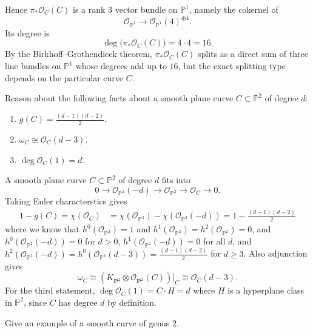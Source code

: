 \documentclass[12pt]{article}
\begin{document}
\begin{solution}
    Hence \(\pi_*\mathcal O_C(C)\) is a rank \(3\) vector bundle on \(\mathbb P^1\), namely the cokernel of
    \[
        \mathcal O_{\mathbb P^1}\longrightarrow \mathcal O_{\mathbb P^1}(4)^{\oplus 4}.
    \]
    Its degree is
    \[
        \deg\bigl(\pi_*\mathcal O_C(C)\bigr)=4\cdot 4=16.
    \]
    By the Birkhoff--Grothendieck theorem, \(\pi_*\mathcal O_C(C)\) splits as a direct sum of three line bundles on \(\mathbb P^1\) whose degrees add up to \(16\), but the exact splitting type depends on the particular curve \(C\).
\end{solution}

\begin{exercise}
    Reason about the following facts about a smooth plane curve $C \subset \mathbb P^2$ of degree $d$:
    \begin{enumerate}
        \item $g(C)=\frac{(d-1)(d-2)}{2}$.
        \item $\omega_C \cong \mathcal O_C(d-3)$.
        \item $\deg \mathcal O_C(1)=d$.
    \end{enumerate}
\end{exercise}
\begin{solution}
    A smooth plane curve $C\subset \mathbb P^2$ of degree $d$ fits into
    \[
        0\to \mathcal O_{\mathbb P^2}(-d)\to \mathcal O_{\mathbb P^2}\to \mathcal O_C\to 0.
    \] Taking Euler characterstics gives \begin{align*}
        1 - g(C) =
        \chi(\mathcal O_C)
        &=
        \chi(\mathcal O_{\mathbb P^2})-\chi(\mathcal O_{\mathbb P^2}(-d))
        =
        1 - \frac{(d-1)(d-2)}{2}
    \end{align*} where we know that $h^0(\mathcal O_{\mathbb P^2})=1$ and $h^1(\mathcal O_{\mathbb P^2})=h^2(\mathcal O_{\mathbb P^2})=0$, and $h^0(\mathcal O_{\mathbb P^2}(-d))=0$ for $d>0$, $h^1(\mathcal O_{\mathbb P^2}(-d))=0$ for all $d$, and $h^2(\mathcal O_{\mathbb P^2}(-d))=h^0(\mathcal O_{\mathbb P^2}(d-3))=\frac{(d-1)(d-2)}{2}$ for $d\ge 3$.
    Also adjunction gives
    \[
        \omega_C \cong (K_{\mathbf P^2}\otimes \mathcal O_{\mathbf P^2}(C))|_C
        \cong \mathcal O_C(d-3).
    \]
    For the third statement, $\deg \mathcal O_C(1) = C \cdot H = d$ where $H$ is a hyperplane class in $\mathbb P^2$, since $C$ has degree $d$ by definition.
\end{solution}


\begin{exercise}
    Give an example of a smooth curve of genus $2$.
\end{exercise}
\end{document}
